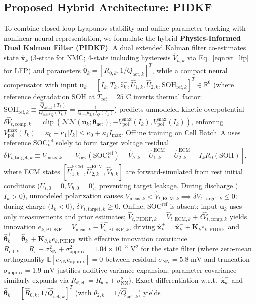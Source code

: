 \documentclass[preprint,12pt]{elsarticle}
\begin{document}
\subsection{Proposed Hybrid Architecture: PIDKF}
To combine closed-loop Lyapunov stability and online parameter tracking with nonlinear neural representation, we formulate the hybrid \textbf{Physics-Informed Dual Kalman Filter (PIDKF)}. A dual extended Kalman filter co-estimates state $\hat{\mathbf{x}}_k$ (3-state for NMC; 4-state including hysteresis $\hat{V}_{h,k}$ via Eq.~\eqref{eqn:vt_lfp} for LFP) and parameters $\hat{\boldsymbol{\theta}}_k = [R_{0,k}, 1/Q_{\text{act},k}]^T$, while a compact neural compensator with input $\mathbf{u}_k = [I_k, T_k, \hat{z}_k^-, \hat{U}_{1,k}^-, \hat{U}_{2,k}^-, \text{SOH}_{\text{ref},k}]^T \in \mathbb{R}^6$ (where reference degradation SOH at $T_{\text{ref}}=25^\circ\text{C}$ inverts thermal factor: $\text{SOH}_{\text{ref},k} \equiv \frac{\hat{Q}_{\text{act},k}(T_k)}{Q_{\text{init}} f_Q(T_k)} = \frac{1}{Q_{\text{init}}\theta_{2,k} f_Q(T_k)}$) predicts unmodeled kinetic overpotential $\delta \hat{V}_{t,\text{comp},k} = \operatorname{clip}(\mathcal{NN}(\mathbf{u}_k; \boldsymbol{\theta}_{\text{net}}), -V_{\text{pol}}^{\max}(I_k), V_{\text{pol}}^{\max}(I_k))$, enforcing $V_{\text{pol}}^{\max}(I_k) = \kappa_0 + \kappa_1 |I_k| \le \kappa_0 + \kappa_1 I_{\max}$. Offline training on Cell Batch~A uses reference $\text{SOC}_k^{\text{ref}}$ solely to form target voltage residual $\delta V_{t,\text{target},k} \equiv V_{\text{meas},k} - [V_{\text{ocv}}(\text{SOC}_k^{\text{ref}}) - \hat{V}_{h,k} - \hat{U}_{1,k}^{\text{ECM}} - \hat{U}_{2,k}^{\text{ECM}} - I_k R_0(\text{SOH})]$, where ECM states $[\hat{U}_{1,k}^{\text{ECM}}, \hat{U}_{2,k}^{\text{ECM}}, \hat{V}_{h,k}]$ are forward-simulated from rest initial conditions ($U_{i,0}=0, V_{h,0}=0$), preventing target leakage. During discharge ($I_k > 0$), unmodeled polarization causes $V_{\text{meas},k} < \hat{V}_{t,\text{ECM},k} \implies \delta V_{t,\text{target},k} \le 0$; during charge ($I_k < 0$), $\delta V_{t,\text{target},k} \ge 0$. Online, $\text{SOC}^{\text{ref}}$ is absent: input $\mathbf{u}_k$ uses only measurements and prior estimates; $\hat{V}_{t,\text{PIDKF},k}^- = \hat{V}_{t,\text{ECM},k}^- + \delta \hat{V}_{t,\text{comp},k}$ yields innovation $e_{k,\text{PIDKF}} = V_{\text{meas},k} - \hat{V}_{t,\text{PIDKF},k}^-$, driving $\hat{\mathbf{x}}_k^+ = \hat{\mathbf{x}}_k^- + \mathbf{K}_k e_{k,\text{PIDKF}}$ and $\hat{\boldsymbol{\theta}}_k^+ = \hat{\boldsymbol{\theta}}_k^- + \mathbf{K}_{\theta,k} e_{k,\text{PIDKF}}$ with effective innovation covariance $R_{\text{eff},k} = R_v + \sigma_{\text{NN}}^2 + \sigma_{\text{approx}}^2 = 1.04 \times 10^{-3}\text{ V}^2$ for the state filter (where zero-mean orthogonality $\mathbb{E}[e_{\text{NN}} e_{\text{approx}}] = 0$ between residual $\sigma_{\text{NN}} = 5.8\text{ mV}$ and truncation $\sigma_{\text{approx}} = 1.9\text{ mV}$ justifies additive variance expansion; parameter covariance similarly expands via $R_{\theta,\text{eff}} = R_{\theta,v} + \sigma_{\text{NN}}^2$). Exact differentiation w.r.t.\ $\hat{\mathbf{x}}_k^-$ and $\hat{\boldsymbol{\theta}}_k = [\hat{R}_{0,k}, 1/\hat{Q}_{\text{act},k}]^T$ (with $\theta_{2,k} = 1/\hat{Q}_{\text{act},k}$) yields 
\end{document}
